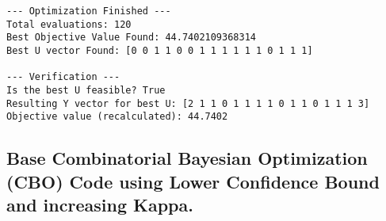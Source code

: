 \documentclass[
  letterpaper,
  DIV=11,
  numbers=noendperiod]{scrartcl}
\begin{document}
\begin{verbatim}
--- Optimization Finished ---
Total evaluations: 120
Best Objective Value Found: 44.7402109368314
Best U vector Found: [0 0 1 1 0 0 1 1 1 1 1 1 0 1 1 1]

--- Verification ---
Is the best U feasible? True
Resulting Y vector for best U: [2 1 1 0 1 1 1 1 0 1 1 0 1 1 1 3]
Objective value (recalculated): 44.7402
\end{verbatim}

\subsection{Base Combinatorial Bayesian Optimization (CBO) Code using
Lower Confidence Bound and increasing
Kappa.}\label{base-combinatorial-bayesian-optimization-cbo-code-using-lower-confidence-bound-and-increasing-kappa.}
\end{document}
